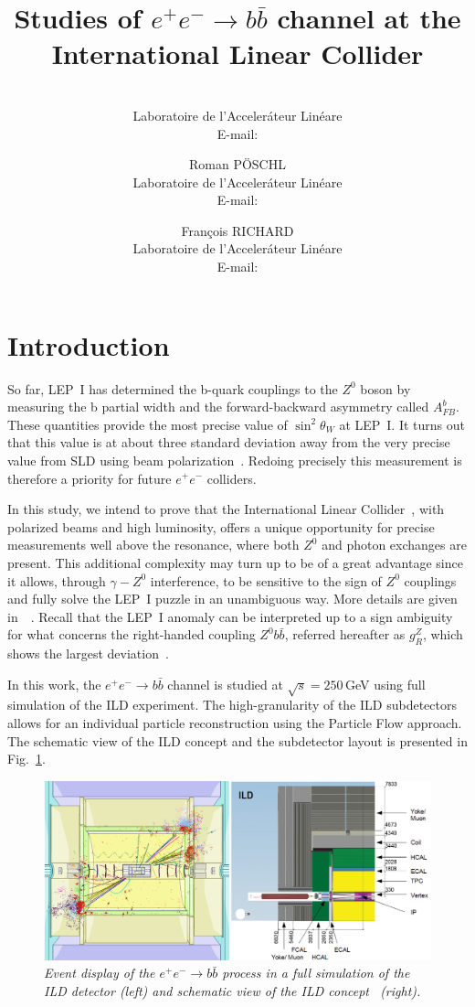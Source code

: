 \documentclass{PoS}
\title{Studies of $ e^+e^-\to b\bar{b}$ channel at the International Linear Collider}
\author{\speaker{Sviatoslav BILOKIN}\\%
        Laboratoire de l'Acceler\'ateur Lin\'eare\\
        E-mail: \email{bilokin@lal.in2p3.fr}}
\author{Roman P\"OSCHL\\
        Laboratoire de l'Acceler\'ateur Lin\'eare\\
        E-mail: \email{poeschl@lal.in2p3.fr}}
\author{Fran\c cois RICHARD\\
	Laboratoire de l'Acceler\'ateur Lin\'eare\\
	E-mail: \email{richard@lal.in2p3.fr}}
\newcommand{\afb}{$A_{FB}^b$}
\begin{document}
\section{Introduction}
So far, LEP~I has determined the b-quark couplings to the $Z^0$ boson by measuring the b partial width and the forward-backward asymmetry called \afb. These quantities provide the most precise value of $\sin^2\theta_W$ at LEP~I. It turns out that this value is at about three standard deviation away from the very precise value from SLD using beam polarization~\cite{bib:AfbSMFit}. Redoing precisely this measurement is therefore a priority for future $e^+e^-$ colliders. 

In this study, we intend to prove that the International Linear Collider~\cite{bib:ILC}, with {polarized beams and high luminosity}, offers a unique opportunity for precise measurements well above the resonance, where both $Z^0$ and photon exchanges are present. 
This additional complexity may turn up to be of a great advantage since it allows, through $\gamma - Z^0$ interference, to be sensitive to the sign of $Z^0$ couplings and fully solve the LEP~I puzzle in an unambiguous way. 
More details are given in~\cite{Bilokin}~\cite{Bilokin:2017lco}.
Recall that the LEP~I anomaly can be interpreted up to a sign ambiguity for what concerns the right-handed coupling $Z^0 b\bar{b}$, referred hereafter as $g_R^Z$, which shows the largest deviation~\cite{bib:RSTOP}.


In this work, the $e^+ e^-\to b\bar{b}$ channel is studied at $\sqrt{s}=250$\,GeV using full simulation of the ILD experiment.
The high-granularity of the ILD subdetectors allows for an individual particle reconstruction using the Particle Flow approach.
The schematic view of the ILD concept and the subdetector layout is presented in Fig.~\ref{fig:ILDScheme}.

\begin{figure}
	{\centering
		\includegraphics[width=0.8\linewidth]{../poster/figures/ild3.png}
		\caption{\sl Event display of the $e^+ e^-\to b\bar{b}$ process in a full simulation of the ILD detector (left) and schematic view of the ILD concept~\cite{bib:ILC} (right). }
		\label{fig:ILDScheme}
	}
\end{figure}
\end{document}
